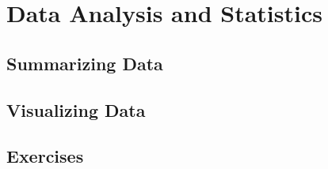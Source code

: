\chapter{Data Analysis and Statistics}

\section{Summarizing Data}

\section{Visualizing Data}

\section{Exercises}
